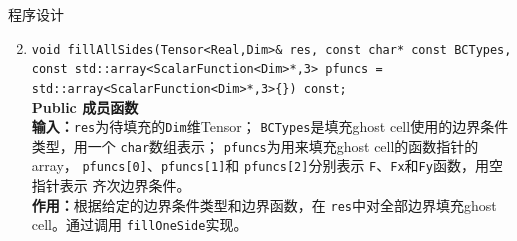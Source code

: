 \documentclass{beamer}
\begin{document}
         \begin{frame}{程序设计}
           \begin{enumerate}[(1)] \setcounter{enumi}{1}
                     \item \texttt{void fillAllSides(Tensor<Real,Dim>\& res,
              const char* const BCTypes, const
                    std::array<ScalarFunction<Dim>*,3> pfuncs =
                    std::array<ScalarFunction<Dim>*,3>\{\}) const;}\\
            \textbf{Public 成员函数}\\
            \textbf{输入：}\texttt{res}为待填充的\texttt{Dim}维Tensor；
            \texttt{BCTypes}是填充ghost cell使用的边界条件类型，用一个
            \texttt{char}数组表示；
                \texttt{pfuncs}为用来填充ghost cell的函数指针的array，
                \texttt{pfuncs[0]}、\texttt{pfuncs[1]}和
                \texttt{pfuncs[2]}分别表示
                \texttt{F}、\texttt{Fx}和\texttt{Fy}函数，用空指针表示
                齐次边界条件。\\
            \textbf{作用：}根据给定的边界条件类型和边界函数，在
            \texttt{res}中对全部边界填充ghost cell。通过调用
            \texttt{fillOneSide}实现。

        \end{enumerate}
  \end{frame}
\end{document}

